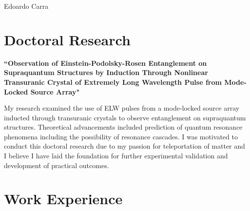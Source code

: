 \documentclass[10pt]{article} %
\begin{document}
\begin{paracol}{2} %


\parbox[top][0.12\textheight][c]{\linewidth}{ %
	\vspace{-0.04\textheight} %
	\centering %
	{\sffamily\Huge Edoardo Carra}\\\medskip %
}


\section{Doctoral Research}

{\raggedright\textbf{``Observation of Einstein-Podolsky-Rosen Entanglement on Supraquantum Structures by Induction Through Nonlinear Transuranic Crystal of Extremely Long Wavelength Pulse from Mode-Locked Source Array"}\\\medskip}

My research examined the use of ELW pulses from a mode-locked source array inducted through transuranic crystals to observe entanglement on supraquantum structures. Theoretical advancements included prediction of quantum resonance phenomena including the possibility of resonance cascades. I was motivated to conduct this doctoral research due to my passion for teleportation of matter and I believe I have laid the foundation for further experimental validation and development of practical outcomes.

\medskip %


\section{Work Experience}


\end{paracol}
\end{document}
